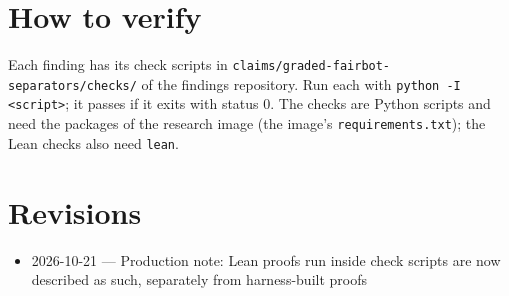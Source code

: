 \documentclass{article}
\begin{document}
\section{How to verify}

Each finding has its check scripts in \texttt{claims/graded-fairbot-separators/checks/} of the findings repository. Run each with \texttt{python -I <script>}; it passes if it exits with status 0. The checks are Python scripts and need the packages of the research image (the image's \texttt{requirements.txt}); the Lean checks also need \texttt{lean}.

\section{Revisions}

\begin{itemize}
\item 2026-10-21 --- Production note: Lean proofs run inside check scripts are now described as such, separately from harness-built proofs
\end{itemize}



\end{document}
